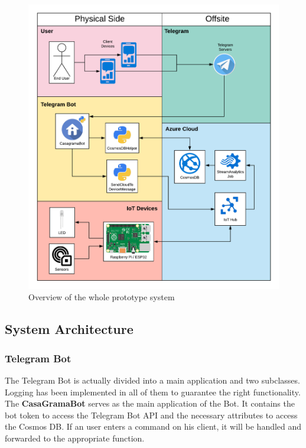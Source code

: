 \documentclass[a4paper]{article}
\begin{document}
		\begin{figure}[!htb]
			\centering
			\includegraphics[width=\textwidth]{img/overview.png}
			\caption{Overview of the whole prototype system}
			\label{fig:systemoverview}
		\end{figure}
	
		\newpage
		
		\subsection{System Architecture}
		
			\subsubsection{Telegram Bot}
			
			The Telegram Bot is actually divided into a main application and two subclasses.
			Logging has been implemented in all of them to guarantee the right functionality.\\
			
			The \textbf{CasaGramaBot} serves as the main application of the Bot.
			It contains the bot token to access the Telegram Bot API and the necessary attributes to access the Cosmos DB.
			If an user enters a command on his client, it will be handled and forwarded to the appropriate function.\\
			
\end{document}
